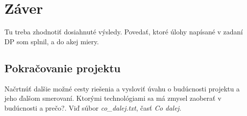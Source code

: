 \chapter{Záver}

Tu treba zhodnotiť dosiahnuté výsledy. Povedať, ktoré úlohy napísané v zadaní DP som splnil, a do akej miery.

\section{Pokračovanie projektu}

Načrtnúť dalšie možné cesty riešenia a vysloviť úvahu o budúcnosti projektu a jeho ďalšom smerovaní. Ktorými technológiami sa má zmysel zaoberať v budúcnosti a prečo?. Viď súbor \emph{co\_dalej.txt}, časť \emph{Co dalej}.